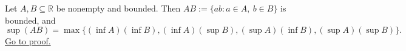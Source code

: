 \begin{theorem}
\label{thm:supremum-product-set}
Let $A,B\subseteq\mathbb{R}$ be nonempty and bounded.  Then
$AB:=\{ab:a\in A,\ b\in B\}$ is bounded, and
\[
  \sup(AB)=
  \max\{(\inf A)(\inf B),(\inf A)(\sup B),(\sup A)(\inf B),(\sup A)(\sup B)\}.
\]
\hyperref[prf:supremum-product-set]{Go to proof.}
\end{theorem}